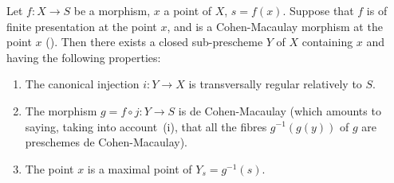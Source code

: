 \begin{proposition}[19.2.9]
\label{IV.19.2.9}
Let $f:X\to S$ be a morphism, $x$ a point of $X$, $s=f(x)$.
Suppose that $f$ is of finite presentation at the point $x$, and is a Cohen-Macaulay morphism at the point $x$ ().
Then there exists a closed sub-prescheme $Y$ of $X$ containing $x$ and having the following properties:
\begin{enumerate}[label=(\roman*)]
  \item The canonical injection $i:Y\to X$ is transversally regular relatively to $S$.
  \item The morphism $g=f\circ j:Y\to S$ is de Cohen-Macaulay (which amounts to saying, taking into account~(i), that all the fibres $g^{-1}(g(y))$ of $g$ are preschemes de Cohen-Macaulay).
  \item The point $x$ is a maximal point of $Y_s=g^{-1}(s)$.
\end{enumerate}
\end{proposition}

